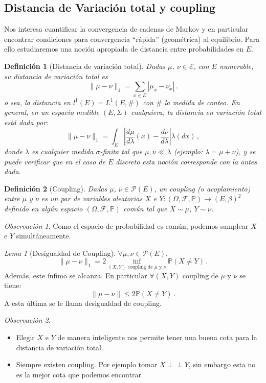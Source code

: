 \documentclass[letterpaper,11pt]{article} %
\theoremstyle{defbreak}
\newtheorem{definition}{Definición}[subsection]
\theoremstyle{propbreak}
\theoremstyle{remark}
\newtheorem{remark}{Observación}[subsection]
\theoremstyle{break}
\newtheorem{lemma}{Lema}[subsection]
\def\P{\mathbb{P}}
\newcommand{\indep}{\perp \!\!\! \perp}
\def\edp{(\Omega,\mathcal{F},\mathbb{P})}
\def\beforeitemize{\leavevmode \vspace{-0.5\baselineskip}}
\begin{document}
\subsection{Distancia de Variación total y coupling }
Nos interesa cuantificar la convergencia de cadenas de Markov y en particular encontrar condiciones para convergencia ``rápida'' (geométrica) al equilibrio. Para ello  estudiaremos una noci\'on apropiada de distancia entre probabilidades en $E$.
\begin{definition}[Distancia de variación total]
\label{def:var_tot}
Dadas $\mu$, $\nu\in\mathcal{E}$, con $E$ numerable, su distancia de variación total es $$\|\mu-\nu\|_1=\sum_{x\in E}|\mu_x-\nu_x| \, .$$
o sea, la distancia en $l^1(E)=L^1(E,\#)$ con $\#$ la medida de conteo.
\newline En general, en un espacio medible $(E,\Sigma)$ cualquiera, la distancia en variación total está dada por:
$$ \|\mu-\nu\|_1=\displaystyle\int_E|\frac{d\mu}{d\lambda}(x)-\frac{d\nu}{d\lambda}|\lambda(dx) \, ,$$
donde $\lambda$ es cualquier medida $\sigma$-finita tal que $\mu,\nu \ll \lambda$ (ejemplo: $\lambda=\mu+\nu$), y se puede verificar que en el caso de $E$ discreto esta noci\'on corresponde con la antes dada. 
\end{definition}
\begin{definition}[Coupling]
Dadas $\mu$, $\nu\in\mathcal{P}(E)$, un coupling (o acoplamiento) entre $\mu$ y $\nu$ es un par de variables aleatorias $X$ e $Y:\edp\to(E,\beta)^2$ definido en algún espacio $\edp$ común tal que $X\sim\mu$, $Y\sim\nu$.
\end{definition}
\begin{remark}
Como el espacio de probabilidad es común, podemos samplear $X$ e $Y$ simultáneamente.
\end{remark}
\begin{lemma}[Desigualdad de Coupling]
\label{lemma:des_coup}
$\forall\mu,\nu\in\mathcal{P}(E)$,
$$ \|\mu-\nu\|_1 = \displaystyle 2\inf_{(X,Y) \mbox{ coupling de }\mu\mbox{ y }\nu}\P(X\neq Y)\, .$$
Además, este ínfimo se alcanza. En particular $\forall (X,Y)$ coupling de $\mu$ y $\nu$ se tiene:
$$ \|\mu-\nu\|\leq 2\P(X\neq Y) \, .$$
A esta última se le llama desigualdad de coupling. 
\end{lemma}
\begin{remark}
\beforeitemize
\begin{itemize}
    \item Elegir $X$ e $Y$ de manera inteligente nos permite tener una buena cota para la distancia de variación total.
    \item Siempre existen coupling. Por ejemplo tomar $X\indep Y$, sin embargo esta no es la mejor cota que podemos encontrar.
\end{itemize}
\end{remark}
\end{document}
